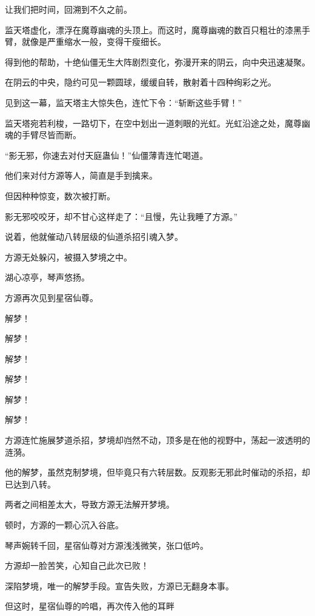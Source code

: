
\begin{this_body}

让我们把时间，回溯到不久之前。

监天塔虚化，漂浮在魔尊幽魂的头顶上。而这时，魔尊幽魂的数百只粗壮的漆黑手臂，就像是严重缩水一般，变得干瘦细长。

得到他的帮助，十绝仙僵无生大阵剧烈变化，弥漫开来的阴云，向中央迅速凝聚。

在阴云的中央，隐约可见一颗圆球，缓缓自转，散射着十四种绚彩之光。

见到这一幕，监天塔主大惊失色，连忙下令：“斩断这些手臂！”

监天塔宛若利梭，一路切下，在空中划出一道刺眼的光虹。光虹沿途之处，魔尊幽魂的手臂尽皆而断。

“影无邪，你速去对付天庭蛊仙！”仙僵薄青连忙喝道。

他们来对付方源等人，简直是手到擒来。

但因种种惊变，数次被打断。

影无邪咬咬牙，却不甘心这样走了：“且慢，先让我睡了方源。”

说着，他就催动八转层级的仙道杀招引魂入梦。

方源无处躲闪，被摄入梦境之中。

湖心凉亭，琴声悠扬。

方源再次见到星宿仙尊。

解梦！

解梦！

解梦！

解梦！

解梦！

解梦！

方源连忙施展梦道杀招，梦境却岿然不动，顶多是在他的视野中，荡起一波透明的涟漪。

他的解梦，虽然克制梦境，但毕竟只有六转层数。反观影无邪此时催动的杀招，却已达到八转。

两者之间相差太大，导致方源无法解开梦境。

顿时，方源的一颗心沉入谷底。

琴声婉转千回，星宿仙尊对方源浅浅微笑，张口低吟。

方源却一脸苦笑，心知自己此次已败！

深陷梦境，唯一的解梦手段。宣告失败，方源已无翻身本事。

但这时，星宿仙尊的吟唱，再次传入他的耳畔


\end{this_body}
